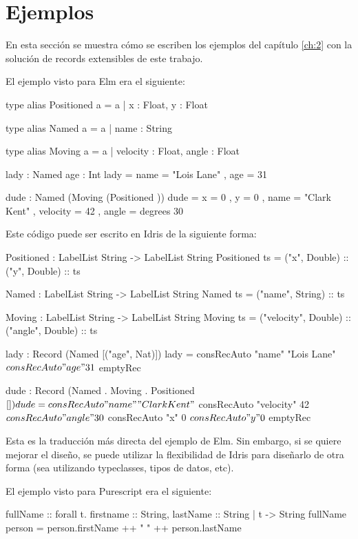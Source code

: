\section{Ejemplos}

En esta sección se muestra cómo se escriben los ejemplos del capítulo \ref{ch:2} con la solución de records extensibles de este trabajo.

El ejemplo visto para Elm era el siguiente:

\begin{code}
type alias Positioned a =
  { a | x : Float, y : Float }

type alias Named a =
  { a | name : String }

type alias Moving a =
  { a | velocity : Float, angle : Float }

lady : Named { age : Int }
lady =
  { name = "Lois Lane"
  , age = 31
  }

dude : Named (Moving (Positioned {}))
dude =
  { x = 0
  , y = 0
  , name = "Clark Kent"
  , velocity = 42
  , angle = degrees 30
  }
\end{code}

Este código puede ser escrito en Idris de la siguiente forma:

\begin{code}
Positioned : LabelList String -> LabelList String
Positioned ts = ("x", Double) :: ("y", Double) :: ts

Named : LabelList String -> LabelList String
Named ts = ("name", String) :: ts

Moving : LabelList String -> LabelList String
Moving ts = ("velocity", Double) :: ("angle", Double) :: ts

lady : Record (Named [("age", Nat)])
lady = consRecAuto "name" "Lois Lane" $
  consRecAuto "age" 31 $
  emptyRec

dude : Record (Named . Moving . Positioned $ [])
dude = consRecAuto "name" "Clark Kent" $
  consRecAuto "velocity" 42 $
  consRecAuto "angle" 30 $
  consRecAuto "x" 0 $
  consRecAuto "y" 0 $
  emptyRec
\end{code}

Esta es la traducción más directa del ejemplo de Elm. Sin embargo, si se quiere mejorar el diseño, se puede utilizar la flexibilidad de Idris para diseñarlo de otra forma (sea utilizando typeclasses, tipos de datos, etc).

El ejemplo visto para Purescript era el siguiente:

\begin{code}
fullName :: forall t. { firstname :: String,
  lastName :: String | t } -> String
fullName person = person.firstName ++ " " ++ person.lastName
\end{code}

